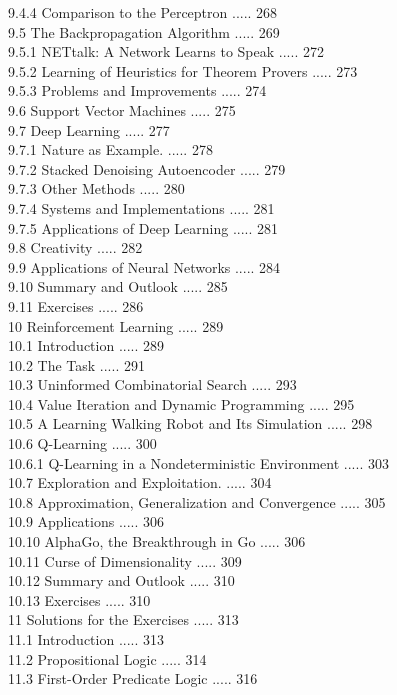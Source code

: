 \documentclass[10pt]{book}
\begin{document}
9.4.4 Comparison to the Perceptron ..... 268\\
9.5 The Backpropagation Algorithm ..... 269\\
9.5.1 NETtalk: A Network Learns to Speak ..... 272\\
9.5.2 Learning of Heuristics for Theorem Provers ..... 273\\
9.5.3 Problems and Improvements ..... 274\\
9.6 Support Vector Machines ..... 275\\
9.7 Deep Learning ..... 277\\
9.7.1 Nature as Example. ..... 278\\
9.7.2 Stacked Denoising Autoencoder ..... 279\\
9.7.3 Other Methods ..... 280\\
9.7.4 Systems and Implementations ..... 281\\
9.7.5 Applications of Deep Learning ..... 281\\
9.8 Creativity ..... 282\\
9.9 Applications of Neural Networks ..... 284\\
9.10 Summary and Outlook ..... 285\\
9.11 Exercises ..... 286\\
10 Reinforcement Learning ..... 289\\
10.1 Introduction ..... 289\\
10.2 The Task ..... 291\\
10.3 Uninformed Combinatorial Search ..... 293\\
10.4 Value Iteration and Dynamic Programming ..... 295\\
10.5 A Learning Walking Robot and Its Simulation ..... 298\\
10.6 Q-Learning ..... 300\\
10.6.1 Q-Learning in a Nondeterministic Environment ..... 303\\
10.7 Exploration and Exploitation. ..... 304\\
10.8 Approximation, Generalization and Convergence ..... 305\\
10.9 Applications ..... 306\\
10.10 AlphaGo, the Breakthrough in Go ..... 306\\
10.11 Curse of Dimensionality ..... 309\\
10.12 Summary and Outlook ..... 310\\
10.13 Exercises ..... 310\\
11 Solutions for the Exercises ..... 313\\
11.1 Introduction ..... 313\\
11.2 Propositional Logic ..... 314\\
11.3 First-Order Predicate Logic ..... 316\\
\end{document}
